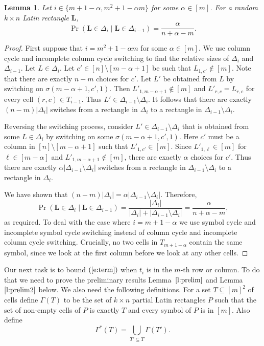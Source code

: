\documentclass[12pt]{article}
\newtheorem{lem}[thm]{Lemma}
\theoremstyle{definition}
\numberwithin{equation}{section}
\def\eref#1{$(\ref{#1})$}
\def\lref#1{Lemma~$\ref{#1}$}
\renewcommand{\L}{\mathbf{L}}
\begin{document}
	\begin{lem}\label{l:setnrc}
		Let $i\in\{m+1-\alpha,m^2+1-\alpha m\}$ for some $\alpha\in[m]$.
		For a random $k \times n$ Latin rectangle $\L$,
		\[
		\Pr(\L \in \Delta_i \mid  \L \in \Delta_{i-1})=\frac{\alpha}{n+\alpha-m}.
		\]
	\end{lem}
	\begin{proof}
		First suppose that $i = m^2+1-\alpha m$ for some $\alpha \in [m]$. We use column cycle and incomplete column cycle switching to find the relative sizes of $\Delta_i$ and $\Delta_{i-1}$. Let $L \in \Delta_i$. Let $c' \in [n] \setminus [m-\alpha+1]$ be such that $L_{1, c'} \not\in [m]$. Note that there are exactly $n-m$ choices for $c'$. Let $L'$ be obtained from $L$ by switching on $\sigma(m-\alpha+1, c', 1)$. Then $L'_{1, m-\alpha+1} \not\in [m]$ and $L'_{r, c} = L_{r, c}$ for every cell $(r, c) \in T_{i-1}$. Thus $L' \in \Delta_{i-1} \setminus \Delta_i$. It follows that there are exactly $(n-m)|\Delta_i|$ switches from a rectangle in $\Delta_i$ to a rectangle in $\Delta_{i-1} \setminus \Delta_i$.
		
		Reversing the switching process, consider $L'\in \Delta_{i-1} \setminus \Delta_i$ that is obtained from some $L\in\Delta_i$ by switching on some $\sigma(m-\alpha+1, c', 1)$. Here $c'$ must be a column in $[n]\setminus [m-\alpha+1]$ such that $L'_{1, c'} \in [m]$.
		Since $L'_{1,\ell}\in[m]$ for $\ell\in[m-\alpha]$ and $L'_{1, m-\alpha+1}\notin[m]$, there are exactly $\alpha$ choices for $c'$. Thus there are exactly $\alpha|\Delta_{i-1} \setminus \Delta_i|$ switches from a rectangle in $\Delta_{i-1} \setminus \Delta_i$ to a rectangle in $\Delta_i$.
		
		We have shown that $(n-m)|\Delta_i| = \alpha|\Delta_{i-1} \setminus \Delta_i|$. Therefore,
		\[
		\Pr(\L \in \Delta_i \mid  \L \in \Delta_{i-1}) = \frac{|\Delta_i|}{|\Delta_i|+|\Delta_{i-1} \setminus \Delta_i|} = \frac{\alpha}{n+\alpha-m},
		\]
		as required. To deal with the case where $i=m+1-\alpha$ we use symbol cycle and incomplete symbol cycle switching instead of column cycle and incomplete column cycle switching. Crucially, no two cells in $T_{m+1-\alpha}$ contain the same symbol, since we look at the first column before we look at any other cells.
	\end{proof}
	
	Our next task is to bound \eref{e:term} when $t_i$ is in the $m$-th row or column. To do that we need to prove the preliminary results \lref{l:prelim} and \lref{l:prelim2} below. We also need the following definitions. For a set $T \subseteq [m]^2$ of cells define $\Gamma(T)$ to be the set of $k \times n$ partial Latin rectangles $P$ such that the set of non-empty cells of $P$ is exactly $T$ and every symbol of $P$ is in $[m]$. Also define 
	\begin{equation}\label{e:Gammastar}
		\Gamma^*(T) = \bigcup_{T' \subseteq T} \Gamma(T').
	\end{equation}
	
\end{document}
